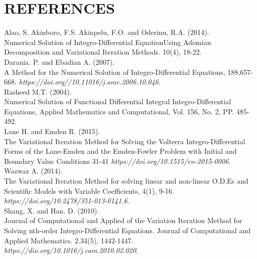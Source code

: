 \documentclass[12pt]{report}
\newcommand{\url}[1]{\textit{#1}}
\newcommand{\NI}{\noindent}
\newcommand{\IDE}{Integro-Differential Equation}
\newcommand{\IDEs}{Integro-Differential Equations}
\begin{document}
	\newpage
	\chapter*{REFERENCES}
	Alao, S. Akinboro, F.S. Akinpelu, F.O. and Oderinu, R.A. (2014).\\
	Numerical Solution of \IDE Using Adomian Decomposition and Variational Iteration Methods. 10(4), 18-22.\\
	
	\NI
	Darania. P. and Ebadian A. (2007).\\
	A Method for the Numerical Solution of \IDEs, 188,657-668. \url{https://doi.org//10.11016/j.amc.2006.10.046}.\\
	
	\NI
	Rasheed M.T. (2004).\\
	Numerical Solution of Functional Differential Integral \IDEs, Applied Mathematics and Computational, Vol. 156, No. 2, PP. 485-492.\\
	
	\NI
	Lane H. and Emden R. (2015).\\
	The Variational Iteration Method for Solving the Volterra Integro-Differential Forms of the Lane-Emden and the Emden-Fowler Problem with Initial and Boundary Value Conditions 31-41 \url{https://doi.org/10.1515/en-2015-0006}.\\
	
	\NI
	Wazwaz A. (2014).\\
	The Variational Iteration Method for solving linear and non-linear O.D.Es and Scientific Models with Variable Coefficients, 4(1), 9-16. \url{https://doi.org/10.2478/351-013-0141.6}.\\
	
	\NI
	Shang, X. and Han. D. (2010).\\
	Journal of Computational and Applied of the Variation Iteration Method for Solving nth-order \IDEs. Journal of Computational and Applied Mathematics. 2.34(5), 1442-1447. \url{https://dio.org/10.1016/j.cam.2010.02.020}.\\
	
\end{document}
